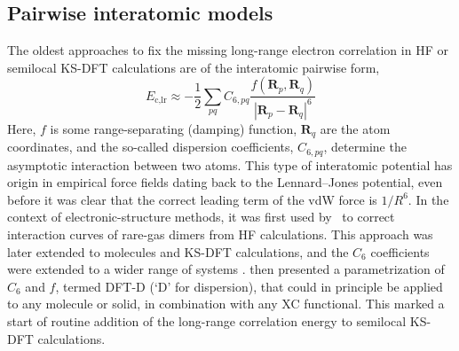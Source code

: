 \subsection{Pairwise interatomic models}\label{sec:pairwise}

The oldest approaches to fix the missing long-range electron correlation in HF or semilocal KS-DFT calculations are of the interatomic pairwise form,
\begin{equation}
  E_\text{c,lr}\approx-\frac12\sum_{pq}C_{6,pq}
  \frac{f(\mathbf R_p,\mathbf R_q)}{|\mathbf R_p-\mathbf R_q|^6}
  \label{eq:pairwise}
\end{equation}
Here, $f$ is some range-separating (damping) function, $\mathbf R_q$ are the atom coordinates, and the so-called dispersion coefficients, $C_{6,pq}$, determine the asymptotic interaction between two atoms.
This type of interatomic potential has origin in empirical force fields dating back to the Lennard--Jones potential, even before it was clear that the correct leading term of the vdW force is $1/R^6$.
In the context of electronic-structure methods, it was first used by~\citet{HepburnCPL75} to correct interaction curves of rare-gas dimers from HF calculations.
This approach was later extended to molecules and KS-DFT calculations, and the $C_6$ coefficients were extended to a wider range of systems \citep{HalgrenJACS92,MooijJPCA99,ElstnerJCP01,WuJCP02}.
\citet{GrimmeJCC04} then presented a parametrization of $C_6$ and $f$, termed DFT-D (`D' for dispersion), that could in principle be applied to any molecule or solid, in combination with any XC functional.
This marked a start of routine addition of the long-range correlation energy to semilocal KS-DFT calculations.

